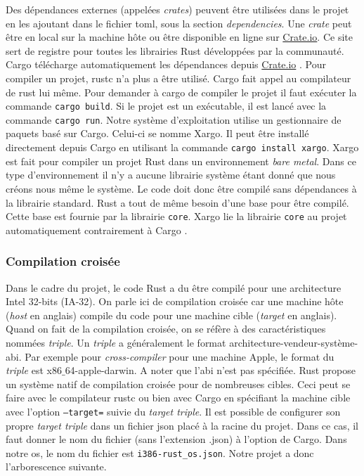 Des dépendances externes (appelées \textit{crates}) peuvent être utilisées dans
le projet en les ajoutant dans le fichier \acrshort{toml}, sous la section \textit{dependencies}.
Une \textit{crate} peut être en local sur la machine hôte ou être disponible en ligne
sur \href{https://crates.io}{Crate.io}. Ce site sert de registre pour toutes les
librairies Rust développées par la communauté. Cargo télécharge automatiquement
les dépendances depuis \href{https://crates.io}{Crate.io} \cite{ref2}. Pour compiler un projet,
rustc n'a plus a être utilisé. Cargo fait appel au compilateur
de rust lui même. Pour demander à cargo de compiler le projet il faut exécuter
la commande \texttt{cargo build}. Si le projet est un exécutable,
il est lancé avec la commande \texttt{cargo run}. Notre système
d'exploitation utilise un gestionnaire de paquets basé sur Cargo. Celui-ci
se nomme Xargo. Il peut être installé directement depuis Cargo en utilisant
la commande \texttt{cargo install xargo}. Xargo est fait pour compiler
un projet Rust dans un environnement \textit{bare metal}. Dans ce type d'environnement
il n'y a aucune librairie système étant donné que nous créons nous même le système.
Le code doit donc être compilé sans dépendances à la librairie standard. Rust a tout
de même besoin d'une base pour être compilé. Cette base est fournie par la librairie
\texttt{core}. Xargo lie la librairie \texttt{core} au projet
automatiquement contrairement à Cargo \cite{ref8}.


\subsubsection{Compilation croisée}
Dans le cadre du projet, le code Rust a du être compilé pour une architecture
Intel 32-bits (\acrshort{IA-32}). On parle ici de compilation croisée
car une machine hôte (\textit{host} en anglais) compile du code pour une
machine cible (\textit{target} en anglais). Quand on fait de la compilation
croisée, on se réfère à des caractéristiques nommées \textit{triple}. Un \textit{triple}
a généralement le format architecture-vendeur-système-\acrshort{abi}. Par exemple
pour \textit{cross-compiler} pour une machine Apple, le format du \textit{triple}
est x86$\_$64-apple-darwin. A noter que l'\acrshort{abi} n'est pas spécifiée.
Rust propose un système natif de compilation croisée pour de nombreuses cibles.
Ceci peut se faire avec le compilateur rustc ou bien avec Cargo en spécifiant
la machine cible avec l'option \texttt{--target=} suivie du
\textit{target triple}. Il est possible de configurer son propre \textit{target triple}
dans un fichier \acrshort{json} placé à la racine du projet. Dans ce cas, il
faut donner le nom du fichier (sans l'extension .json) à l'option de Cargo.
Dans notre \acrshort{os}, le nom du fichier est \texttt{i386-rust_os.json}.
Notre projet a donc l'arborescence suivante. \\

